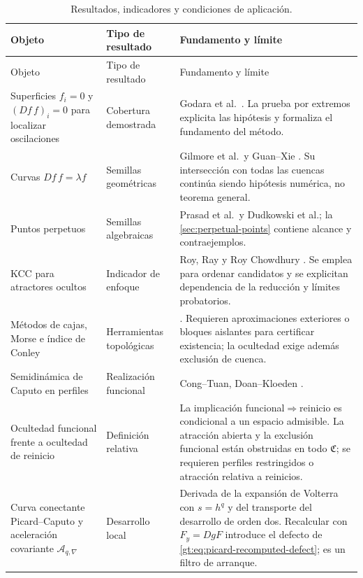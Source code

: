 \begin{longtable}{@{}L{4.0cm}L{3.0cm}L{6.2cm}@{}}
\caption{Resultados, indicadores y condiciones de aplicación.}
\label{tab:gt-novelty-map}\\
\toprule
Objeto & Tipo de resultado & Fundamento y límite\\
\midrule
\endfirsthead
\toprule
Objeto & Tipo de resultado & Fundamento y límite\\
\midrule
\endhead
Superficies $f_i=0$ y $(Df\,f)_i=0$ para localizar oscilaciones & Cobertura demostrada
& Godara et al.\ \cite{GodaraEtAl2018CriticalSurfaces}. La prueba por extremos
explicita las hipótesis y formaliza el fundamento del método.\\
Curvas $Df\,f=\lambda f$ & Semillas geométricas & Gilmore et al.\ y Guan--Xie
\cite{GilmoreEtAl2010Connecting,GuanXie2021Connecting}. Su intersección con
todas las cuencas continúa siendo hipótesis numérica, no teorema general.\\
Puntos perpetuos & Semillas algebraicas & Prasad et al.\ y Dudkowski et al.; la
\cref{sec:perpetual-points} contiene alcance y contraejemplos.\\
KCC para atractores ocultos & Indicador de enfoque & Roy, Ray y Roy Chowdhury
\cite{RoyRayChowdhury2024KCC}. Se emplea para ordenar candidatos y se explicitan
dependencia de la reducción y límites probatorios.\\
Métodos de cajas, Morse e índice de Conley & Herramientas topológicas &
\cite{DellnitzHohmann1997Subdivision,KaliesEtAl2005ChainRecurrence,
MischaikowEtAl2016Conley}. Requieren aproximaciones exteriores o bloques
aislantes para certificar existencia; la ocultedad exige además exclusión de
cuenca.\\
Semidinámica de Caputo en perfiles & Realización funcional & Cong--Tuan,
Doan--Kloeden \cite{CongTuan2017Nonlocal,DoanKloeden2021Semidynamical,
DoanKloeden2024Attractors}.\\
Ocultedad funcional frente a ocultedad de reinicio & Definición relativa &
La implicación funcional$\Rightarrow$reinicio es condicional a un espacio
admisible. La atracción abierta y la exclusión funcional están obstruidas en
todo $\mathfrak C$; se requieren perfiles restringidos o atracción relativa
a reinicios.\\
Curva conectante Picard--Caputo y aceleración covariante
$\mathcal A_{q,\nabla}$ & Desarrollo local & Derivada de la expansión de
Volterra con $s=h^q$ y del transporte del desarrollo de orden dos. Recalcular
con $F_y=DgF$ introduce el defecto de
\eqref{gt:eq:picard-recomputed-defect}; es un filtro de arranque.\\

\end{longtable}
